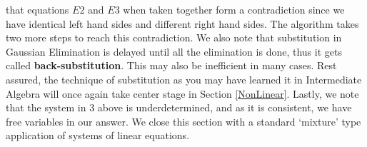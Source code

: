 that equations $E2$ and $E3$ when taken together form a contradiction since we have identical left hand sides and different right hand sides.  The algorithm takes two more steps to reach this contradiction.  We also note that substitution in Gaussian Elimination is delayed until all the elimination is done, thus it gets called   \textbf{back-substitution}.  This may also be inefficient in many cases.  Rest assured, the technique of substitution as you may have learned it in Intermediate Algebra will once again take center stage in Section \ref{NonLinear}. Lastly, we note that the system in 3 above is underdetermined, and as it is consistent, we have free variables in our answer.  We close this section with a standard `mixture' type application of systems of linear equations.


